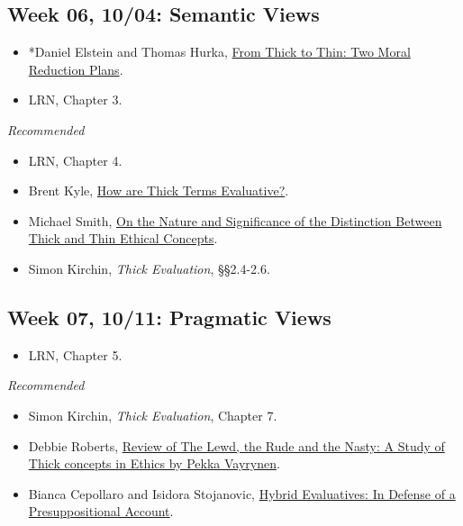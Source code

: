 \documentclass[
]{article}
\providecommand{\tightlist}{%
  \setlength{\itemsep}{0pt}\setlength{\parskip}{0pt}}
\begin{document}
\hypertarget{week-06-1004-semantic-views}{%
\subsection{Week 06, 10/04: Semantic
Views}\label{week-06-1004-semantic-views}}

\begin{itemize}
\tightlist
\item
  *Daniel Elstein and Thomas Hurka,
  \href{https://www.jstor.org/stable/27822063}{From Thick to Thin: Two
  Moral Reduction Plans}.
\item
  LRN, Chapter 3.
\end{itemize}

\emph{Recommended}

\begin{itemize}
\tightlist
\item
  LRN, Chapter 4.
\item
  Brent Kyle, \href{http://hdl.handle.net/2027/spo.3521354.0013.001}{How
  are Thick Terms Evaluative?}.
\item
  Michael Smith,
  \href{http://www.princeton.edu/~msmith/mypapers/Thick\%20and\%20Thin.pdf}{On
  the Nature and Significance of the Distinction Between Thick and Thin
  Ethical Concepts}.
\item
  Simon Kirchin, \emph{Thick Evaluation}, §§2.4-2.6.
\end{itemize}

\newpage

\hypertarget{week-07-1011-pragmatic-views}{%
\subsection{Week 07, 10/11: Pragmatic
Views}\label{week-07-1011-pragmatic-views}}

\begin{itemize}
\tightlist
\item
  LRN, Chapter 5.
\end{itemize}

\emph{Recommended}

\begin{itemize}
\tightlist
\item
  Simon Kirchin, \emph{Thick Evaluation}, Chapter 7.
\item
  Debbie Roberts,
  \href{https://www.journals.uchicago.edu/doi/10.1086/679534}{Review of
  The Lewd, the Rude and the Nasty: A Study of Thick concepts in Ethics
  by Pekka Vayrynen}.
\item
  Bianca Cepollaro and Isidora Stojanovic,
  \href{https://brill.com/view/journals/gps/93/3/article-p458_7.xml}{Hybrid
  Evaluatives: In Defense of a Presuppositional Account}.
\end{itemize}
\end{document}
